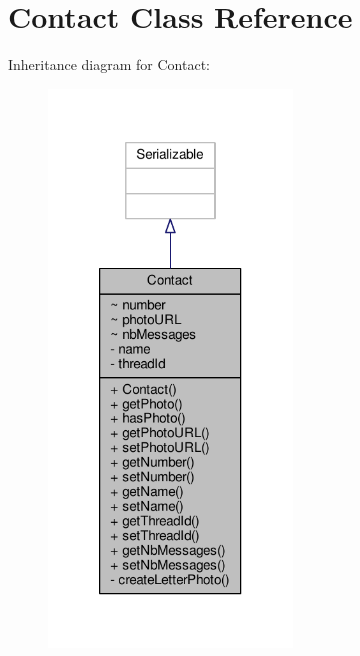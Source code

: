 \hypertarget{a00005}{\section{Contact Class Reference}
\label{a00005}
}


Inheritance diagram for Contact\+:
\nopagebreak
\begin{figure}[H]
\begin{center}
\leavevmode
\includegraphics[width=184pt]{a00043}
\end{center}
\end{figure}


